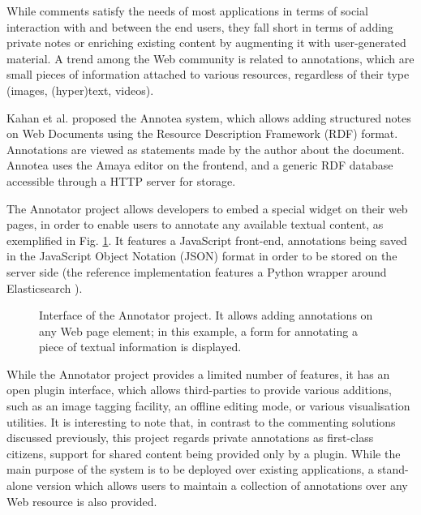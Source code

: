 While comments satisfy the needs of most applications in terms of social
interaction with and between the end users, they fall short in terms of adding
private notes or enriching existing content by augmenting it with
user-generated material. A trend among the Web community is related to
annotations, which are small pieces of information attached to various
resources, regardless of their type (images, (hyper)text, videos).

Kahan et al. \cite{ref:annotea} proposed the Annotea system, which allows
adding structured notes on Web Documents using the Resource Description
Framework (RDF) format. Annotations are viewed as statements made by the author
about the document. Annotea uses the Amaya \cite{ref:amaya} editor on the
frontend, and a generic RDF database accessible through a HTTP server for
storage.

The Annotator project \cite{ref:annotator} allows developers to embed a special
widget on their web pages, in order to enable users to annotate any available
textual content, as exemplified in Fig. \ref{fig:annotator}.  It features a
JavaScript front-end, annotations being saved in the JavaScript Object Notation
(JSON) format in order to be stored on the server side (the reference
implementation features a Python wrapper around Elasticsearch
\cite{ref:elasearch}).

\begin{figure}[!ht]
  \centering
  \caption[Interface of the Annotator project]
          {Interface of the Annotator project. It allows
           adding annotations on any Web page element; in this example, a form
           for annotating a piece of textual information is displayed.}
  \label{fig:annotator}
\end{figure}

While the Annotator project provides a limited number of features, it has an
open plugin interface, which allows third-parties to provide various additions,
such as an image tagging facility, an offline editing mode, or various
visualisation utilities. It is interesting to note that, in contrast to the
commenting solutions discussed previously, this project regards private
annotations as first-class citizens, support for shared content being provided
only by a plugin. While the main purpose of the system is to be deployed over
existing applications, a stand-alone version which allows users to maintain a
collection of annotations over any Web resource is also provided.

